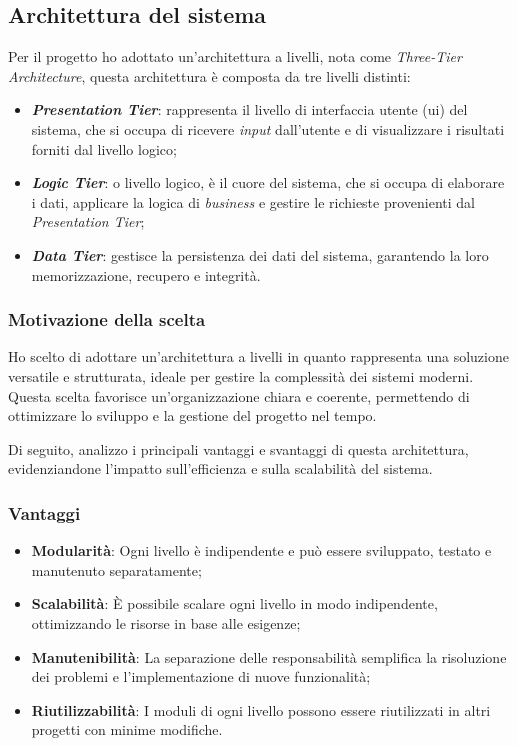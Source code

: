 \subsection{Architettura del sistema}
\label{subsec:architettura}

Per il progetto ho adottato un'architettura a livelli, nota come \textit{Three-Tier Architecture}, questa architettura è composta da tre livelli distinti:

\begin{itemize}
    \item \textbf{\textit{Presentation Tier}}: rappresenta il livello di interfaccia utente (\gls{ui}) del sistema,
    che si occupa di ricevere \textit{input} dall'utente e di visualizzare i risultati forniti dal livello logico;
    
    \item \textbf{\textit{Logic Tier}}: o livello logico, è il cuore del sistema,
    che si occupa di elaborare i dati, applicare la logica di \textit{business} e gestire le richieste provenienti dal \textit{Presentation Tier};
    
    \item \textbf{\textit{Data Tier}}: gestisce la persistenza dei dati del sistema, garantendo la loro memorizzazione, recupero e integrità.
\end{itemize}

\subsubsection{Motivazione della scelta}

\noindent Ho scelto di adottare un'architettura a livelli in quanto rappresenta una soluzione versatile e strutturata, ideale per gestire la complessità dei sistemi moderni. \\
Questa scelta favorisce un'organizzazione chiara e coerente, permettendo di ottimizzare lo sviluppo e la gestione del progetto nel tempo.

\noindent Di seguito, analizzo i principali vantaggi e svantaggi di questa architettura, evidenziandone l'impatto sull'efficienza e sulla scalabilità del sistema.
\pagebreak
\subsubsection{Vantaggi}
\begin{itemize}
    \item \textbf{Modularità}: Ogni livello è indipendente e può essere sviluppato, testato e manutenuto separatamente;
    \item \textbf{Scalabilità}: È possibile scalare ogni livello in modo indipendente, ottimizzando le risorse in base alle esigenze;
    \item \textbf{Manutenibilità}: La separazione delle responsabilità semplifica la risoluzione dei problemi e l'implementazione di nuove funzionalità;
    \item \textbf{Riutilizzabilità}: I moduli di ogni livello possono essere riutilizzati in altri progetti con minime modifiche.
\end{itemize}

